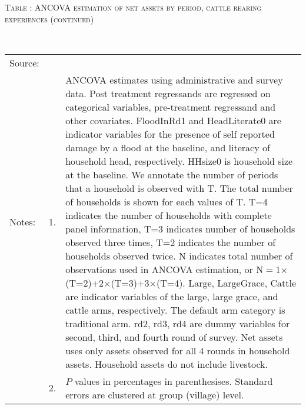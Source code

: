 \addtocounter{table}{-1}
\hspace{-1cm}\begin{minipage}[t]{14cm}
\hfil\textsc{\normalsize Table \thetable: ANCOVA estimation of net assets by period, cattle rearing experiences (continued) \label{tab ANCOVA narrow net assets Experience timevarying 2}}\\
\setlength{\tabcolsep}{1pt}
\setlength{\baselineskip}{8pt}
\renewcommand{\arraystretch}{.52}
\hfil{}\\
\renewcommand{\arraystretch}{.8}
\setlength{\tabcolsep}{1pt}
\begin{tabular}{>{\hfill\scriptsize}p{1cm}<{}>{\hfill\scriptsize}p{.25cm}<{}>{\scriptsize}p{12cm}<{\hfill}}
Source:& \multicolumn{2}{l}{\scriptsize Estimated with GUK administrative and survey data.}\\
Notes: & 1. & ANCOVA estimates using administrative and survey data. Post treatment regressands are regressed on categorical variables, pre-treatment regressand and other covariates. \textsf{FloodInRd1} and \textsf{HeadLiterate0} are indicator variables for the presence of self reported damage by a flood at the baseline, and literacy of household head, respectively. \textsf{HHsize0} is household size at the baseline. We annotate the number of periods that a household is observed with \textsf{T}. The total number of households is shown for each values of \textsf{T}. \textsf{T=4} indicates the number of households with complete panel information, \textsf{T=3} indicates number of households observed three times, \textsf{T=2} indicates the number of households observed twice. \textsf{N} indicates total number of observations used in ANCOVA estimation, or \textsf{N$=$1$\times$(T=2)+2$\times$(T=3)+3$\times$(T=4)}.  \textsf{Large}, \textsf{LargeGrace}, \textsf{Cattle} are indicator variables of the \textsf{large}, \textsf{large grace}, and \textsf{cattle} arms, respectively. The default arm category is \textsf{traditional} arm. \textsf{rd2, rd3, rd4} are dummy variables for second, third, and fourth round of survey. Net assets uses only assets observed for all 4 rounds in household assets. Household assets do not include livestock. \\
& 2. & $P$ values in percentages in parenthesises. Standard errors are clustered at group (village) level.
\end{tabular}
\end{minipage}



